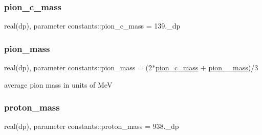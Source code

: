 \subsubsection{\texorpdfstring{pion\+\_\+c\+\_\+mass}{pion\_c\_mass}}
{\footnotesize\ttfamily real(dp), parameter constants\+::pion\+\_\+c\+\_\+mass = 139.\+\_\+dp}

\mbox{\label{namespaceconstants_afc100a7b1657caff60d09094b943d318}} 
\subsubsection{\texorpdfstring{pion\+\_\+mass}{pion\_mass}}
{\footnotesize\ttfamily real(dp), parameter constants\+::pion\+\_\+mass = (2$\ast$\hyperlink{namespaceconstants_a336fcf9a7d6a3f7ccfb4cb3b4757510e}{pion\+\_\+c\+\_\+mass} + \hyperlink{namespaceconstants_a27737907e81ada5ba3cff169aaad6377}{pion\+\_\+\_\+mass})/3}



average pion mass in units of MeV 

\mbox{\label{namespaceconstants_acaf7324e893fcf39c2ea181aff272f46}} 
\subsubsection{\texorpdfstring{proton\+\_\+mass}{proton\_mass}}
{\footnotesize\ttfamily real(dp), parameter constants\+::proton\+\_\+mass = 938.\+\_\+dp}

